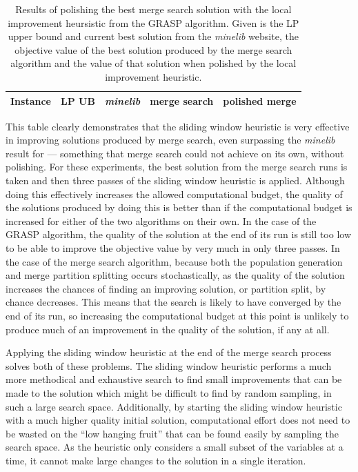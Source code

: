 \documentclass[journal]{IEEEtran}
\begin{document}
\begin{table}[h!]
\centering
\caption[Results of polishing the best merge search solution]{Results of polishing the best merge search solution with the local improvement heursistic from the GRASP algorithm. Given is the LP upper bound and current best solution from the \emph{minelib} website, the objective value of the best solution produced by the merge search algorithm and the value of that solution when polished by the local improvement heuristic.}\label{tab:mine:polish}
\begin{adjustbox}{width=0.45\textwidth}
\begin{tabular}{lrrrr} \toprule
Instance & \multicolumn{1}{c}{LP UB} & \multicolumn{1}{c}{\emph{minelib}} & \multicolumn{1}{c}{merge search} & polished merge\\ 
\midrule
%

%
\bottomrule
\end{tabular}
\end{adjustbox}
\end{table}

This table clearly demonstrates that the sliding window heuristic is very effective in improving solutions produced by merge search, even surpassing the \emph{minelib} result for \zucklarge{} --- something that merge search could not achieve on its own, without polishing. For these experiments, the best solution from the merge search runs is taken and then three passes of the sliding window heuristic is applied. Although doing this effectively increases the allowed computational budget, the quality of the solutions produced by doing this is better than if the computational budget is increased for either of the two algorithms on their own. In the case of the GRASP algorithm, the quality of the solution at the end of its run is still too low to be able to improve the objective value by very much in only three passes. In the case of the merge search algorithm, because both the population generation and merge partition splitting occurs stochastically, as the quality of the solution increases the chances of finding an improving solution, or partition split, by chance decreases. This means that the search is likely to have converged by the end of its run, so increasing the computational budget at this point is unlikely to produce much of an improvement in the quality of the solution, if any at all.

Applying the sliding window heuristic at the end of the merge search process solves both of these problems. The sliding window heuristic performs a much more methodical and exhaustive search to find small improvements that can be made to the solution which might be difficult to find by random sampling, in such a large search space. Additionally, by starting the sliding window heuristic with a much higher quality initial solution, computational effort does not need to be wasted on the ``low hanging fruit'' that can be found easily by sampling the search space. As the heuristic only considers a small subset of the variables at a time, it cannot make large changes to the solution in a single iteration. 
\end{document}

